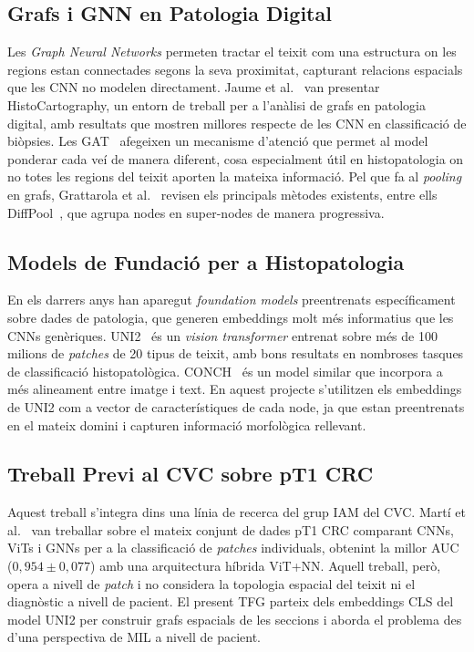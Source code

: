 \documentclass[10pt,a4paper,twocolumn,twoside]{article}
\begin{document}
\subsection{Grafs i GNN en Patologia Digital}

Les \textit{Graph Neural Networks} permeten tractar el teixit com una estructura on les
regions estan connectades segons la seva proximitat, capturant relacions espacials que les
CNN no modelen directament. Jaume et al.~\cite{jaume2021histocartographytoolkitgraphanalytics}
van presentar HistoCartography, un entorn de treball per a l'anàlisi de grafs en patologia
digital, amb resultats que mostren millores respecte de les CNN en classificació de
biòpsies. Les GAT~\cite{veličković2018graphattentionnetworks} afegeixen un mecanisme
d'atenció que permet al model ponderar cada veí de manera diferent, cosa especialment útil
en histopatologia on no totes les regions del teixit aporten la mateixa informació. Pel que
fa al \textit{pooling} en grafs, Grattarola et al.~\cite{Grattarola_2024} revisen els
principals mètodes existents, entre ells DiffPool~\cite{ying2019hierarchicalgraphrepresentationlearning},
que agrupa nodes en super-nodes de manera progressiva.

\subsection{Models de Fundació per a Histopatologia}

En els darrers anys han aparegut \textit{foundation models} preentrenats específicament
sobre dades de patologia, que generen embeddings molt més informatius que les CNNs
genèriques. UNI2~\cite{chen2024uni2} és un \textit{vision transformer} entrenat sobre
més de 100 milions de \textit{patches} de 20 tipus de teixit, amb bons resultats en
nombroses tasques de classificació histopatològica. CONCH~\cite{lu2024conch} és un model
similar que incorpora a més alineament entre imatge i text. En aquest projecte s'utilitzen
els embeddings de UNI2 com a vector de característiques de cada node, ja que estan
preentrenats en el mateix domini i capturen informació morfològica rellevant.

\subsection{Treball Previ al CVC sobre pT1 CRC}

Aquest treball s'integra dins una línia de recerca del grup IAM del CVC. Martí et
al.~\cite{ddd.uab.cat:317556} van treballar sobre el mateix conjunt de dades pT1 CRC
comparant CNNs, ViTs i GNNs per a la classificació de \textit{patches} individuals,
obtenint la millor AUC ($0{,}954 \pm 0{,}077$) amb una arquitectura híbrida ViT+NN.
Aquell treball, però, opera a nivell de \textit{patch} i no considera la topologia
espacial del teixit ni el diagnòstic a nivell de pacient. El present TFG parteix dels
embeddings CLS del model UNI2 per construir grafs espacials de les seccions i aborda
el problema des d'una perspectiva de MIL a nivell de pacient.
\end{document}
